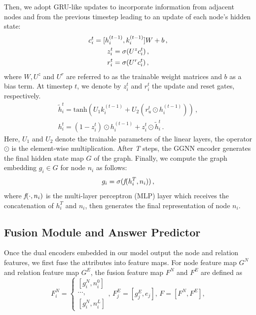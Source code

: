 \documentclass[letterpaper]{article} %
\begin{document}
Then, we adopt GRU-like updates to incorporate information from adjacent nodes and from the previous timestep leading to an update of each node's hidden state:
\begin{gather}\notag
    c_i^t = [h_i^{(t-1)}, k_{i}^{(t-1)}] W + b \, ,\\
    z_i^t = \sigma(U^z c_i^t) \, , \\\notag
    r_i^t = \sigma(U^r c_i^t)\, , \notag
\end{gather}
where $W, U^z$ and $U^r$ are referred to as the trainable weight matrices and $b$ as a bias term.
At timestep $t$, we denote by $z_i^t$ and $r_i^t$ the update and reset gates, respectively.
\begin{gather}
    \tilde{h}_i^t = \text{tanh}(U_1 k_{i}^{(t-1)} + U_2(r_u^t \odot h_i^{(t-1)})) \, ,\\
    h_i^t = (1-z_i^t)\odot h_i^{(t-1)} + z_i^t\odot \tilde{h}_i^t \, .
\end{gather}
Here, $U_1$ and $U_2$ denote the trainable parameters of the linear layers, the operator $\odot$ is the element-wise multiplication.
After \emph{T} steps, the GGNN encoder generates the final hidden state map $G$ of the graph. 
Finally, we compute the graph embedding $g_i \in G$ for node ${n}_i$ as follows:
\begin{equation}
    g_i = \sigma( \emph{f}(h_i^T, n_i)) \, ,
\end{equation}
where $\emph{f}(\cdot, n_i)$ is the multi-layer perceptron (MLP) layer which receives the concatenation of $h_i^T$ and $n_i$, then generates the final representation of node ${n}_i$. 

\subsection{Fusion Module and Answer Predictor}

Once the dual encoders embedded in our model output the node and relation features, we first fuse the attributes into feature maps. For node feature map $G^N$ and relation feature map $G^E$, the fusion feature map $F^N$ and $F^E$ are defined as
{\small \begin{equation}
F_i^N= \begin{cases}
[g_i^N, n_i^0]  \\
\cdots, \\
[g_i^N, n_i^L]
\end{cases} 
,\, F_j^E = [g_j^E, e_j] , \,
    F = [F^N, F^E]  ,
\end{equation}
}
\end{document}
